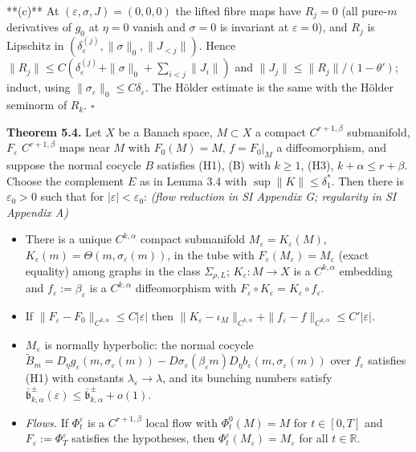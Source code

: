 \documentclass[11pt,a4paper]{article}
\theoremstyle{plain}
\theoremstyle{definition}
\theoremstyle{remark}
\numberwithin{equation}{section}
\numberwithin{figure}{section}
\begin{document}
**(c)** At $(\varepsilon,\sigma,J)=(0,0,0)$ the lifted fibre maps have $R_j=0$ (all pure-$m$ derivatives of $g_0$ at $\eta=0$ vanish and $\sigma=0$ is invariant at $\varepsilon=0$), and $R_j$ is Lipschitz in $(\delta_\varepsilon^{(j)},\|\sigma\|_0,\|J_{<j}\|)$. Hence $\|R_j\|\le C(\delta^{(j)}_\varepsilon+\|\sigma\|_0+\sum_{i<j}\|J_i\|)$ and $\|J_j\|\le\|R_j\|/(1-\theta')$; induct, using $\|\sigma_\varepsilon\|_0\le C\delta_\varepsilon$. The Hölder estimate is the same with the Hölder seminorm of $R_k$. $\square$

\textbf{Theorem 5.4.} Let $X$ be a Banach space, $M\subset X$ a compact $C^{r+1,\beta}$ submanifold, $F_\varepsilon$ $C^{r+1,\beta}$ maps near $M$ with $F_0(M)=M$, $f=F_0|_M$ a diffeomorphism, and suppose the normal cocycle $B$ satisfies (H1), (B) with $k\ge1$, (H3), $k+\alpha\le r+\beta$. Choose the complement $E$ as in Lemma 3.4 with $\sup\|K\|\le\delta^*_1$. Then there is $\varepsilon_0>0$ such that for $|\varepsilon|<\varepsilon_0$: \textit{(flow reduction in SI Appendix G; regularity in SI Appendix A)}
\begin{itemize}
    \item[(a)] There is a unique $C^{k,\alpha}$ compact submanifold $M_\varepsilon=K_\varepsilon(M)$, $K_\varepsilon(m)=\Theta(m,\sigma_\varepsilon(m))$, in the tube with $F_\varepsilon(M_\varepsilon)=M_\varepsilon$ (exact equality) among graphs in the class $\Sigma_{\rho,L}$; $K_\varepsilon:M\to X$ is a $C^{k,\alpha}$ embedding and $f_\varepsilon:=\beta_\varepsilon$ is a $C^{k,\alpha}$ diffeomorphism with $F_\varepsilon\circ K_\varepsilon=K_\varepsilon\circ f_\varepsilon$.
    \item[(b)] If $\|F_\varepsilon-F_0\|_{C^{k,\alpha}}\le C|\varepsilon|$ then $\|K_\varepsilon-\iota_M\|_{C^{k,\alpha}}+\|f_\varepsilon-f\|_{C^{k,\alpha}}\le C'|\varepsilon|$.
    \item[(c)] $M_\varepsilon$ is normally hyperbolic: the normal cocycle $\tilde B_m=D_\eta g_\varepsilon(m,\sigma_\varepsilon(m))-D\sigma_\varepsilon(\beta_\varepsilon m)D_\eta b_\varepsilon(m,\sigma_\varepsilon(m))$ over $f_\varepsilon$ satisfies (H1) with constants $\lambda_\varepsilon\to\lambda$, and its bunching numbers satisfy $\bar{\mathfrak b}^\pm_{k,\alpha}(\varepsilon)\le\bar{\mathfrak b}^\pm_{k,\alpha}+o(1)$.
    \item[(d)] \textit{Flows.} If $\Phi^\varepsilon_t$ is a $C^{r+1,\beta}$ local flow with $\Phi^0_t(M)=M$ for $t\in[0,T]$ and $F_\varepsilon:=\Phi^\varepsilon_T$ satisfies the hypotheses, then $\Phi^\varepsilon_t(M_\varepsilon)=M_\varepsilon$ for all $t\in\mathbb R$.
\end{itemize}
\end{document}
